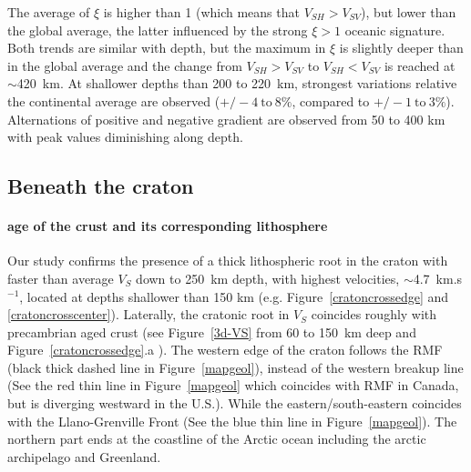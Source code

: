 \documentclass[12pt]{article}
\begin{document}
		The average of $\xi$ is higher than 1 (which means that $V_{SH} > V_{SV}$), but lower than the global average, the latter influenced by the strong $\xi > 1$ oceanic signature. 
		Both trends are similar with depth, but the maximum in $\xi$ is slightly deeper than in the global average and the change from $V_{SH} > V_{SV}$ to $V_{SH} < V_{SV}$ is reached at $\sim$420~km. 
		At shallower depths than 200 to 220~km, strongest variations relative the continental average are observed ($+/- 4 \: \text{to} \: 8 \%$, compared to $+/- 1 \: \text{to} \: 3 \%$). 
		Alternations of positive and negative gradient are observed from 50 to 400 km with peak values diminishing along depth. 


	\subsection{Beneath the craton}

		\paragraph{age of the crust and its corresponding lithosphere}
		Our study confirms the presence of a thick lithospheric root in the craton with faster than average $V_S$ down to 250~km depth, with highest velocities, $\sim$4.7~km.s$^{-1}$, located at depths shallower than  150 km (e.g. Figure~\ref{cratoncrossedge} and \ref{cratoncrosscenter}). 
		Laterally, the cratonic root in $V_S$ coincides roughly with precambrian aged crust (see Figure~\ref{3d-VS} from 60 to 150~km deep and Figure~\ref{cratoncrossedge}.a ).
		The western edge of the craton follows the RMF (black thick dashed line in Figure~\ref{mapgeol}), instead of the western breakup line (See the red thin line in Figure~\ref{mapgeol} which coincides with RMF in Canada, but is diverging westward in the U.S.). 
		While the eastern/south-eastern coincides with the Llano-Grenville Front (See the blue thin line in Figure~\ref{mapgeol}). 
		The northern part ends at the coastline of the Arctic ocean including the arctic archipelago and Greenland. 
\end{document}
